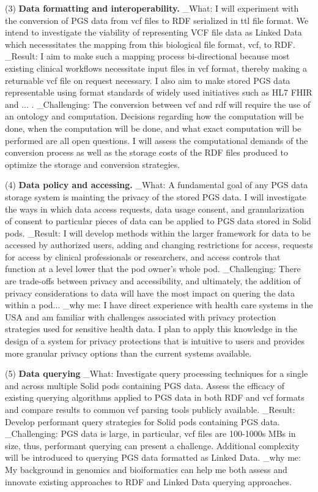 \documentclass[11pt]{article}
\begin{document}
(3) \textbf{Data formatting and interoperability.} 
_What: I will experiment with the conversion of PGS data from vcf files to RDF serialized in ttl file format. 
We intend to investigate the viability of representing VCF file data as Linked Data which necesssitates the mapping from this biological file format, vcf, to RDF. 
_Result: I aim to make such a mapping process bi-directional because most existing clinical workflows necessitate input files in vcf format, thereby making a returnable vcf file on request necessary. 
I also aim to make stored PGS data representable using format standards of widely used initiatives such as HL7 FHIR and ... . 
_Challenging: The conversion between vcf and rdf will require the use of an ontology and computation. 
Decisions regarding how the computation will be done, when the computation will be done, and what exact computation will be performed are all open questions.
I will assess the computational demands of the conversion process as well as the storage costs of the RDF files produced to optimize the storage and conversion strategies.


(4) \textbf{Data policy and accessing.} 
_What: A fundamental goal of any PGS data storage system is mainting the privacy of the stored PGS data. 
I will investigate the ways in which data access requests, data usage consent, and granularization of consent to particular pieces of data can be applied to PGS data stored in Solid pods.
_Result: I will develop methods within the larger framework for data to be accessed by authorized users, adding and changing restrictions for access, requests for access by clinical professionals or researchers, and access controls that function at a level lower that the pod owner's whole pod.
_Challenging: There are trade-offs between privacy and accessibility, and ultimately, the addition of privacy considerations to data will have the most impact on quering the data within a pod...
_why me: I have direct experience with health care systems in the USA and am familiar with challenges associated with privacy protection strategies used for sensitive health data. 
I plan to apply this knowledge in the design of a system for privacy protections that is intuitive to users and provides more granular privacy options than the current systems available. 

(5) \textbf{Data querying}
_What: Investigate query processing techniques for a single and across multiple Solid pods containing PGS data. 
Assess the efficacy of existing querying algorithms applied to PGS data in both RDF and vcf formats and compare results to common vcf parsing tools publicly available.
_Result: Develop performant query strategies for Solid pods containing PGS data.
_Challenging: PGS data is large, in particular, vcf files are 100-1000s MBs in size, thus, performant querying can present a challenge. Additional complexity will be introduced to querying PGS data formatted as Linked Data.
_why me: My background in genomics and bioiformatics can help me both assess and innovate existing approaches to RDF and Linked Data querying approaches.
\end{document}
